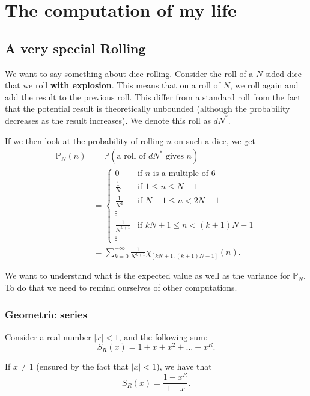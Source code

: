 \documentclass[a4paper,oneside,11pt]{book}
\renewcommand{\Pr}{\mathbb{P}}
\begin{document}
\tableofcontents
\chapter{The computation of my life}
\section{A very special Rolling}
We want to say something about dice rolling. Consider the roll of a $N$-sided dice that we roll {\bfseries with explosion}. This means that on a roll of $N$, we roll again and add the result to the previous roll. This differ from a standard roll from the fact that the potential result is theoretically unbounded (although the probability decreases as the result increases). We denote this roll as $dN^*$.

If we then look at the probability of rolling $n$ on such a dice, we get
\begin{align}
	\Pr_N(n)&=\Pr\left(\mbox{a roll of }dN^*\mbox{ gives }n\right)=
\\
	&=\left\{\begin{array}{cl}
		0						& \mbox{if } n \mbox{ is a multiple of }6	\\
		\frac1N 		& \mbox{if } 1\le n\le N-1	\\
		\frac1{N^2} & \mbox{if } N+1\le n<2N-1	\\
		\vdots			&	\\
		\frac1{N^{k+1}} & \mbox{if } kN+1\le n<\left(k+1\right)N-1	\\
		\vdots
	\end{array}\right.
\\
	&=\sum_{k=0}^{+\infty}\frac1{N^{k+1}}\chi_{[kN+1,\left(k+1\right)N-1]}(n).
\end{align}

We want to understand what is the expected value as well as the variance for $\Pr_N$. To do that we need to remind ourselves of other computations.

\subsection{Geometric series}
Consider a real number $\left|x\right|<1$, and the following sum:
\begin{equation}
	S_R(x)=1+x+x^2+\ldots+x^R.
\end{equation}

If $x\neq1$ (ensured by the fact that $\left|x\right|<1$), we have that
\begin{equation}
	S_R(x)=\frac{1-x^R}{1-x}.
\end{equation}
\end{document}
